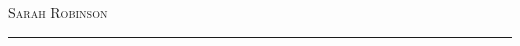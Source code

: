 \documentclass[11pt]{article}
\begin{document}
\begin{center}

{\Huge\textsc{Sarah Robinson}} \\[5pt]



\end{center}





\vspace{-6pt}

\noindent\rule{\textwidth}{1pt}

\vspace{6pt}
\end{document}
